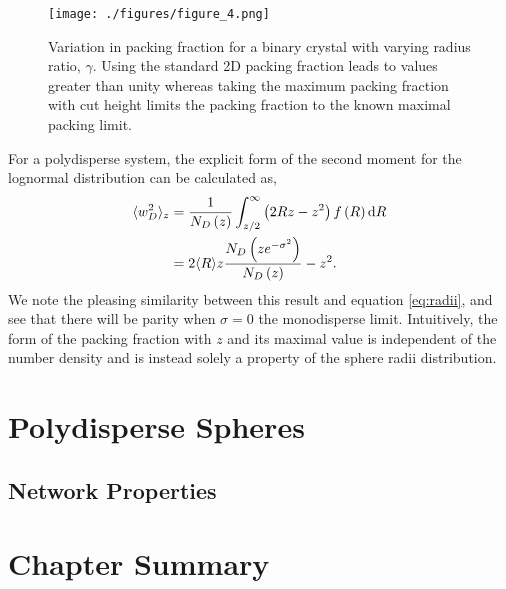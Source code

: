 \begin{figure}[bt]
	\texttt{[image: ./figures/figure\_4.png]}
	\caption{Variation in packing fraction for a binary crystal with varying radius ratio, $\gamma$.
	Using the standard 2D packing fraction leads to values greater than unity whereas taking the maximum packing fraction with cut height limits the packing fraction to the known maximal packing limit.}
	\label{fig:crystalpackingfrac}
\end{figure}

For a polydisperse system, the explicit form of the second moment for the lognormal distribution can be calculated as,
\begin{align}
	\label{eq:wiid}
	\langle w_D^2 \rangle_z &= \frac{1}{N_D\left(z\right)}\int_{z/2}^\infty  \left(2Rz-z^2\right) f\left(R\right) \text{d} R \nonumber \\
	&= 2\langle R\rangle z\frac{N_D\left(ze^{-\sigma^2}\right)}{N_D\left(z\right)}-z^2.
\end{align}
We note the pleasing similarity between this result and equation \eqref{eq:radii}, and see that there will be parity when $\sigma=0$ \ie{} the monodisperse limit. 
Intuitively, the form of the packing fraction with $z$ and its maximal value is independent of the number density and is instead solely a property of the sphere radii distribution. 

\section{Polydisperse Spheres}

\subsection{Network Properties}

\section{Chapter Summary}
